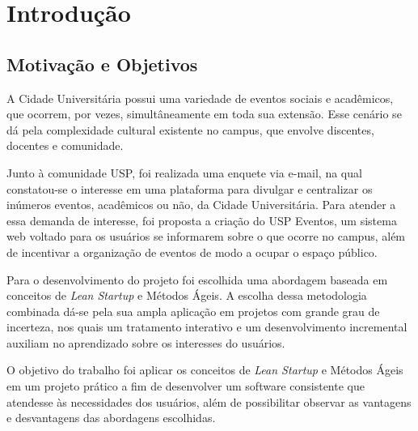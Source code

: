 \chapter{Introdução}
\label{cap:introducao}
\section{Motivação e Objetivos}

\par A Cidade Universitária possui uma variedade de eventos sociais e acadêmicos, que ocorrem, por vezes, simultâneamente em toda sua extensão. Esse cenário se dá pela complexidade cultural existente no campus, que envolve discentes, docentes e comunidade.

\par Junto à comunidade USP, foi realizada uma enquete via e-mail, na qual constatou-se o interesse em uma plataforma para divulgar e centralizar os inúmeros eventos, acadêmicos ou não, da Cidade Universitária. Para atender a essa demanda de interesse, foi proposta a criação do USP Eventos, um sistema web voltado para os usuários se informarem sobre o que ocorre no campus, além de incentivar a organização de eventos de modo a ocupar o espaço público.

\par Para o desenvolvimento do projeto foi escolhida uma abordagem baseada em conceitos de \emph{Lean Startup} e Métodos Ágeis. A escolha dessa metodologia combinada dá-se pela sua ampla aplicação em projetos com grande grau de incerteza, nos quais um tratamento interativo e um desenvolvimento incremental auxiliam no aprendizado sobre os interesses do usuários.

\par O objetivo do trabalho foi aplicar os conceitos de \emph{Lean Startup} e Métodos Ágeis em um projeto prático a fim de desenvolver um software consistente que atendesse às necessidades dos usuários, além de possibilitar observar as vantagens e desvantagens das abordagens escolhidas.
